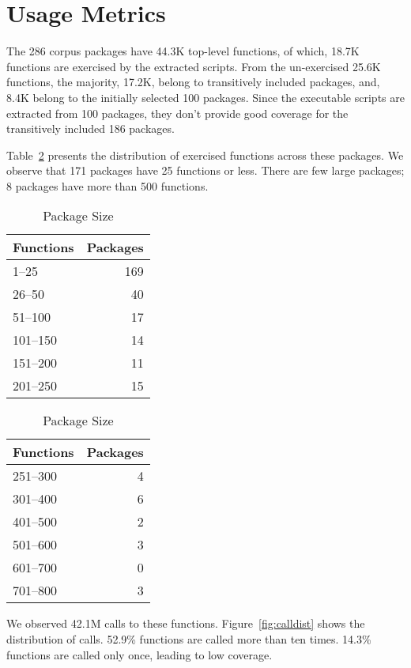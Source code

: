\documentclass[10pt,review,sigplan,anonymous=true,authorversion=true,nonacm=true]{acmart}
\begin{document}
\section{Usage Metrics}

The 286 corpus packages have 44.3K top-level functions, of which, 18.7K
functions are exercised by the extracted scripts. From the un-exercised 25.6K
functions, the majority, 17.2K, belong to transitively included packages, and,
8.4K belong to the initially selected 100 packages. Since the executable scripts
are extracted from 100 packages, they don't provide good coverage for the
transitively included 186 packages.

Table~\ref{table:packsize} presents the distribution of exercised functions
across these packages. We observe that 171 packages have 25 functions or less.
There are few large packages; 8 packages have more than 500 functions.

\begin{table}[!h]
  \vspace{-2mm}
  \small
  \caption{Package Size} \label{table:packsize}
  \centering
  \begin{tabular}{lr}
    \toprule
    \bf Functions&\bf Packages\\
    \midrule
    1--25&169\\
    26--50&40\\
    51--100&17\\
    101--150&14\\
    151--200&11\\
    201--250&15\\
    \bottomrule
  \end{tabular}
  \quad
  \begin{tabular}{lr}
    \toprule
    \bf Functions&\bf Packages\\
    \midrule
    251--300&4\\
    301--400&6\\
    401--500&2\\
    501--600&3\\
    601--700&0\\
    701--800&3\\
    \bottomrule
  \end{tabular}
\end{table}

We observed 42.1M calls to these functions. Figure~\ref{fig:calldist} shows the
distribution of calls. 52.9\% functions are called more than ten times. 14.3\%
functions are called only once, leading to low coverage.
\end{document}

